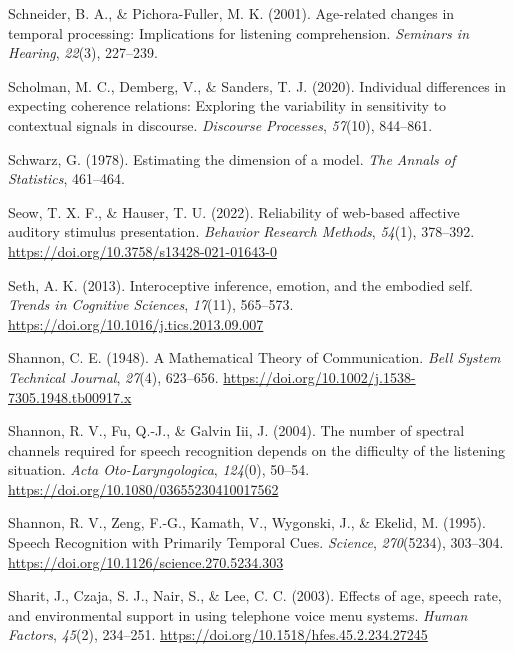 \documentclass[a4paper, nobind]{templates/ociamthesis}
\newlength{\cslhangindent}
\newenvironment{CSLReferences}[2] %
 {%
  \setlength{\parindent}{0pt}
  \ifodd #1
  \let\oldpar\par
  \def\par{\hangindent=\cslhangindent\oldpar}
  \fi
  \setlength{\parskip}{1mm}
  \setlength{\baselineskip}{6mm}
 }%
 {}
\begin{document}
\begin{CSLReferences}{1}{0}
\leavevmode{}%
Schneider, B. A., \& Pichora-Fuller, M. K. (2001). Age-related changes in temporal processing: Implications for listening comprehension. \emph{Seminars in Hearing}, \emph{22}(3), 227--239.

\leavevmode{}%
Scholman, M. C., Demberg, V., \& Sanders, T. J. (2020). Individual differences in expecting coherence relations: Exploring the variability in sensitivity to contextual signals in discourse. \emph{Discourse Processes}, \emph{57}(10), 844--861.

\leavevmode{}%
Schwarz, G. (1978). Estimating the dimension of a model. \emph{The Annals of Statistics}, 461--464.

\leavevmode{}%
Seow, T. X. F., \& Hauser, T. U. (2022). {Reliability of web-based affective auditory stimulus presentation}. \emph{Behavior Research Methods}, \emph{54}(1), 378--392. \url{https://doi.org/10.3758/s13428-021-01643-0}

\leavevmode{}%
Seth, A. K. (2013). Interoceptive inference, emotion, and the embodied self. \emph{Trends in Cognitive Sciences}, \emph{17}(11), 565--573. \url{https://doi.org/10.1016/j.tics.2013.09.007}

\leavevmode{}%
Shannon, C. E. (1948). A Mathematical Theory of Communication. \emph{Bell System Technical Journal}, \emph{27}(4), 623--656. \url{https://doi.org/10.1002/j.1538-7305.1948.tb00917.x}

\leavevmode{}%
Shannon, R. V., Fu, Q.-J., \& Galvin Iii, J. (2004). {The number of spectral channels required for speech recognition depends on the difficulty of the listening situation}. \emph{Acta Oto-Laryngologica}, \emph{124}(0), 50--54. \url{https://doi.org/10.1080/03655230410017562}

\leavevmode{}%
Shannon, R. V., Zeng, F.-G., Kamath, V., Wygonski, J., \& Ekelid, M. (1995). Speech Recognition with Primarily Temporal Cues. \emph{Science}, \emph{270}(5234), 303--304. \url{https://doi.org/10.1126/science.270.5234.303}

\leavevmode{}%
Sharit, J., Czaja, S. J., Nair, S., \& Lee, C. C. (2003). {Effects of age, speech rate, and environmental support in using telephone voice menu systems}. \emph{Human Factors}, \emph{45}(2), 234--251. \url{https://doi.org/10.1518/hfes.45.2.234.27245}


\end{CSLReferences}
\end{document}

